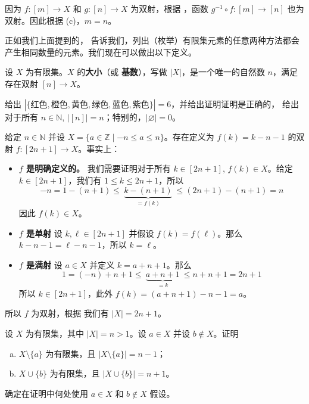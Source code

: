 \begin{cproof}
因为 $f : [m] \to X$ 和 $g : [n] \to X$ 为双射，根据 ，函数 $g^{-1} \circ f : [m] \to [n]$ 也为双射。因此根据 (c)，$m=n$。
\end{cproof}

正如我们上面提到的， 告诉我们，列出（枚举）有限集元素的任意两种方法都会产生相同数量的元素。我们现在可以做出以下定义。

\begin{definition}
\label{defSize}
设 $X$ 为有限集。$X$ 的\textbf{大小}（或 \textbf{基数}），写做 $|X|$，是一个唯一的自然数 $n$，满足存在双射 $[n] \to X$。
\end{definition}

\begin{example}
 给出 $|\{ \text{红色}, \text{橙色}, \text{黄色}, \text{绿色}, \text{蓝色}, \text{紫色} \}| = 6$，并给出证明证明是正确的， 给出对于所有 $n \in \mathbb{N}$, $|[n]| = n$；特别的，$|\varnothing| = 0$。
\end{example}

\begin{example}
\label{exBijectionFromIntegersFromMinusNToNToBracketTwoNPlusOne}
给定 $n \in \mathbb{N}$ 并设 $X = \{ a \in \mathbb{Z} \mid -n \le a \le n \}$。存在定义为 $f(k) = k-n-1$ 的双射 $f : [2n+1] \to X$。事实上：
\begin{itemize}
\item \textbf{$f$ 是明确定义的。}
我们需要证明对于所有 $k \in [2n+1]$, $f(k) \in X$。给定 $k \in [2n+1]$，我们有 $1 \le k \le 2n+1$，所以
\[ -n = 1-(n+1) \le ~ \underbrace{k-(n+1)}_{=f(k)} ~  \le (2n+1) - (n+1) = n \]
因此 $f(k) \in X$。
\item \textbf{$f$ 是单射} 设 $k, \ell \in [2n+1]$ 并假设 $f(k) = f(\ell)$。那么 $k - n - 1 = \ell - n - 1$，所以 $k = \ell$。
\item \textbf{$f$ 是满射} 设 $a \in X$ 并定义 $k = a+n+1$。那么
\[ 1 = (-n) + n + 1 \le ~ \underbrace{a + n + 1}_{= k} ~ \le n + n + 1 = 2n+1 \]
所以 $k \in [2n+1]$，此外 $f(k) = (a+n+1)-n-1 = a$。
\end{itemize}
所以 $f$ 为双射，根据  我们有 $|X| = 2n+1$。
\end{example}

\begin{exercise}
\label{exAddRemoveElementsOfFiniteSets}
设 $X$ 为有限集，其中 $|X| = n > 1$。设 $a \in X$ 并设 $b \not \in X$。证明
\begin{enumerate}[(a)]
\item $X \setminus \{ a \}$ 为有限集，且 $|X \setminus \{ a \}| = n-1$；
\item $X \cup \{ b \}$ 为有限集，且 $|X \cup \{ b \}| = n+1$。
\end{enumerate}
确定在证明中何处使用 $a \in X$ 和 $b \not \in X$ 假设。
\end{exercise}

